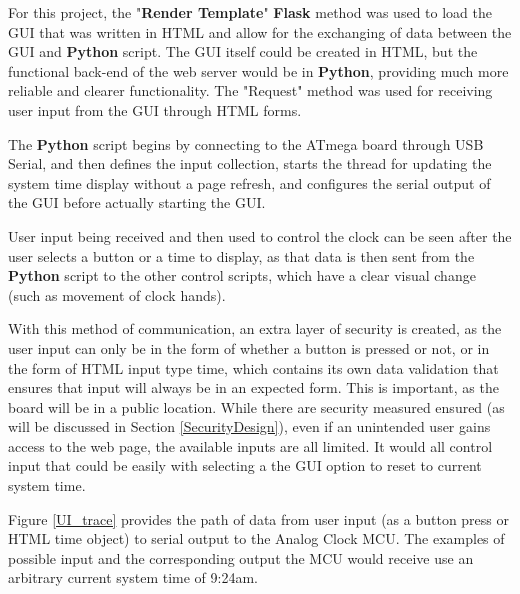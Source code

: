 \documentclass[11pt]{article}
\begin{document}


For this project, the "\textbf{Render Template}" \textbf{Flask} method was used to load the GUI that was written in HTML and allow for the exchanging of data between the GUI and \textbf{Python} script. The GUI itself could be created in HTML, but the functional back-end of the web server would be in \textbf{Python}, providing much more reliable and clearer functionality. The "Request" method was used for receiving user input from the GUI through HTML forms. 

The \textbf{Python} script begins by connecting to the ATmega board through USB Serial, and then defines the input collection, starts the thread for updating the system time display without a page refresh, and configures the serial output of the GUI before actually starting the GUI. 

User input being received and then used to control the clock can be seen after the user selects a button or a time to display, as that data is then sent from the \textbf{Python} script to the other control scripts, which have a clear visual change (such as movement of clock hands). 

With this method of communication, an extra layer of security is created, as the user input can only be in the form of whether a button is pressed or not, or in the form of HTML input type time, which contains its own data validation that ensures that input will always be in an expected form. 
This is important, as the board will be in a public location. While there are security measured ensured (as will be discussed in Section \ref{SecurityDesign}), even if an unintended user gains access to the web page, the available inputs are all limited. It would all control input that could be easily with selecting a the GUI option to reset to current system time. 

Figure \ref{UI_trace} provides the path of data from user input (as a button press or HTML time object) to serial output to the Analog Clock MCU. The examples of possible input and the corresponding output the MCU would receive use an arbitrary current system time of 9:24am. 
\end{document}
